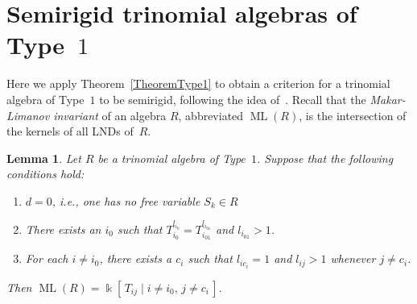 \documentclass[a4paper,reqno,12pt]{amsart}
\theoremstyle{plain}
\theoremstyle{definition}
\theoremstyle{plain}
\newtheorem{lemma}[theorem]{Lemma}
\theoremstyle{remark}
\DeclareMathOperator{\ML}{ML}
\newcommand{\kk}{\Bbbk}
\begin{document}
\section{Semirigid trinomial algebras of Type~$1$}
Here we apply Theorem~\ref{TheoremType1} to obtain a criterion for a trinomial algebra of Type~$1$ to be semirigid, following the idea of~\cite[Section~6]{G_Danielewski}. Recall that the \emph{Makar-Limanov invariant} of an algebra $R$, abbreviated $\ML(R)$, is the intersection of the kernels of all LNDs of~$R$. %
\begin{lemma}\label{LemmaMLweek}
    Let $R$ be a trinomial algebra of Type~$1$. Suppose that the following conditions hold:
    \begin{enumerate}
        \item [$(a)$] $d=0$, i.e., one has no free variable $S_k\in R$
        \item [$(b)$] There exists an $i_0$ such that $T_{i_0}^{l_{i_0}}=T_{i_01}^{l_{i_01}}$ and $l_{i_01}>1$.
        \item [$(c)$] For each $i\neq i_0$, there exists a $c_i$ such that $l_{ic_i}=1$ and $l_{ij}>1$ whenever $j\neq c_i$.
    \end{enumerate}
    Then $\ML (R)=\kk[\,T_{ij}\mid i\neq i_0, \,j\neq c_i\,].$
\end{lemma}
\end{document}

